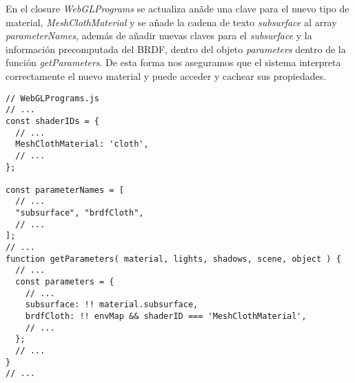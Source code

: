 En el closure \textit{WebGLPrograms} se actualiza an\~ade una clave para el nuevo tipo de material, \textit{MeshClothMaterial}
y se a\~nade la cadena de texto \textit{subsurface} al array \textit{parameterNames}, adem\'as de a\~nadir nuevas claves para
el \textit{subsurface} y la informaci\'on precomputada del BRDF, dentro del objeto \textit{parameters} dentro de la funci\'on
\textit{getParameters}. De esta forma nos aseguramos que el sistema interpreta correctamente el nuevo material y puede acceder
y cachear sus propiedades.

\singlespacing
\begin{lstlisting}[caption=Cambios sobre la clase WebGLPrograms de ThreeJs]
// WebGLPrograms.js
// ...
const shaderIDs = {
  // ...
  MeshClothMaterial: 'cloth',
  // ...
};

const parameterNames = [
  // ...
  "subsurface", "brdfCloth",
  // ...
];
// ...
function getParameters( material, lights, shadows, scene, object ) {
  // ...
  const parameters = {
    // ...
    subsurface: !! material.subsurface,
    brdfCloth: !! envMap && shaderID === 'MeshClothMaterial',
    // ...
  };
  // ...
}
// ...
\end{lstlisting}





